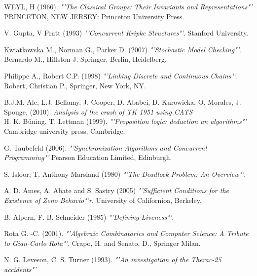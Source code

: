 \documentclass{article}%
\begin{document}
\clearpage  %





\begin{thebibliography}{9}


WEYL, H (1966).
\textit{"'The Classical Groups: Their Invariants and Representations"'}\\ 
PRINCETON, NEW JERSEY: Princeton University Press.

V. Gupta, V Pratt (1993)
\textit{"'Concurrent Kripke Structures"'}. 
Stanford University.

Kwiatkowska M., Norman G., Parker D. (2007)
\textit{"'Stochastic Model Checking"'}. 
Bernardo M., Hillston J. Springer, Berlin, Heidelberg.

Philippe A., Robert C.P. (1998)  
\textit{"'Linking Discrete and Continuous Chains"'}. 
Robert, Christian P., Springer, New York, NY.

B.J.M. Ale, L.J. Bellamy, J. Cooper, D. Ababei, D. Kurowicka, O. Morales, J. Spouge, (2010).
\textit{Analysis of the crash of TK 1951 using CATS}\\

H. K. Büning, T. Lettman (1999).
\textit{"'Proposition logic: deduction an algorithms"'}\\
Cambridge university press, Cambridge. 

G. Taubefeld (2006).
\textit{"'Synchronization Algorithms and Concurrent Programming"'}
Pearson Education Limited, Edinburgh. 

S. Isloor, T. Anthony Marsland (1980)
\textit{"'The Deadlock Problem: An Overview"'}. 

A. D. Ames, A. Abate and S. Sastry (2005)
\textit{"'Sufficient Conditions for the Existence of Zeno Behavio"'r}.
University of Californioa, Berkeley.

B. Alpern, F. B. Schneider (1985)
\textit{"'Defining Liveness"'}. 

Rota G. -C. (2001).
\textit{"'Algebraic Combinatorics and Computer Science: A Tribute to Gian-Carlo Rota"'}.
Crapo, H. and Senato, D., Springer Milan.

\bibitem{}
N. G. Leveson, C. S. Turner (1993).
\textit{"'An investigation of the Therac-25 accidents"'}\\

\end{thebibliography}
\end{document}
